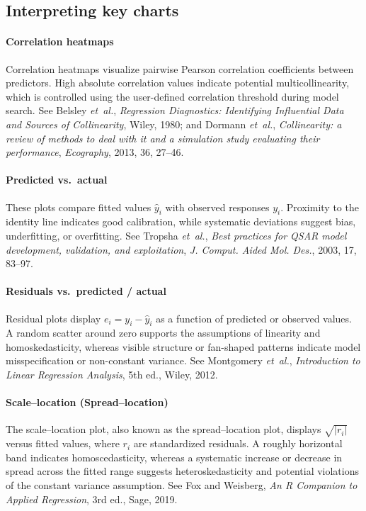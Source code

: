 \documentclass[11pt,a4paper]{article}
\begin{document}
\subsection{Interpreting key charts}

\paragraph{Correlation heatmaps}
Correlation heatmaps visualize pairwise Pearson correlation coefficients between predictors. High absolute correlation values indicate potential multicollinearity, which is controlled using the user-defined correlation threshold during model search.
See Belsley \emph{et~al.}, \emph{Regression Diagnostics: Identifying Influential Data and Sources of Collinearity}, Wiley, 1980; and Dormann \emph{et~al.}, \emph{Collinearity: a review of methods to deal with it and a simulation study evaluating their performance}, \emph{Ecography}, 2013, 36, 27--46.

\paragraph{Predicted vs.\ actual}
These plots compare fitted values $\hat{y}_i$ with observed responses $y_i$. Proximity to the identity line indicates good calibration, while systematic deviations suggest bias, underfitting, or overfitting.
See Tropsha \emph{et~al.}, \emph{Best practices for QSAR model development, validation, and exploitation}, \emph{J. Comput. Aided Mol. Des.}, 2003, 17, 83--97.

\paragraph{Residuals vs.\ predicted / actual}
Residual plots display $e_i = y_i - \hat{y}_i$ as a function of predicted or observed values. A random scatter around zero supports the assumptions of linearity and homoskedasticity, whereas visible structure or fan-shaped patterns indicate model misspecification or non-constant variance.
See Montgomery \emph{et~al.}, \emph{Introduction to Linear Regression Analysis}, 5th ed., Wiley, 2012.

\paragraph{Scale--location (Spread--location)}
The scale--location plot, also known as the spread--location plot, displays $\sqrt{|r_i|}$ versus fitted values, where $r_i$ are standardized residuals. A roughly horizontal band indicates homoscedasticity, whereas a systematic increase or decrease in spread across the fitted range suggests heteroskedasticity and potential violations of the constant variance assumption.
See Fox and Weisberg, \emph{An R Companion to Applied Regression}, 3rd ed., Sage, 2019.
\end{document}
